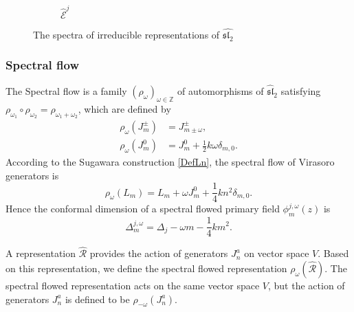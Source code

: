 \documentclass[10pt,a4paper]{article}
\numberwithin{equation}{section}
\begin{document}
\begin{figure}[htbp!]
\begin{subfigure}[b]{0.48\textwidth}
    \caption{$\widehat{\mathcal{E}}^{j}$}
    \label{fig:E}
\end{subfigure}

    \caption{The spectra of irreducible representations of $\widehat{\mathfrak{sl}_{2}}$}
    \label{fig:irrep}
\end{figure}

\subsubsection*{Spectral flow}
The Spectral flow is a family $(\rho_{\omega})_{\omega \in \mathbb{Z}}$ of automorphisms of $\widehat{\mathfrak{sl}}_{2}$
satisfying $\rho_{\omega_{1}} \circ \rho_{\omega_{2}}  = \rho_{\omega_{1} + \omega_{2}}$, which are defined by 
\begin{equation}
    \begin{aligned}
        \rho_{\omega}(J^{\pm}_{m}) & = J^{\pm}_{m \pm \omega},\\
        \rho_{\omega}(J^{0}_{m}) & = J^{0}_{m} + \frac{1}{2} k \omega \delta_{m,0}.
    \end{aligned}
\end{equation}
According to the Sugawara construction \eqref{DefLn}, the spectral flow of Virasoro generators is 
\begin{equation}
    \rho_{\omega}(L_{m}) = L_{m} + \omega J^{0}_{m} + \frac{1}{4} k n^{2} \delta_{m,0}.
\end{equation}
Hence the conformal dimension of a spectral flowed primary field $\phi^{j,\omega}_{m}(z)$ is 
\begin{equation}
    \Delta^{j,\omega}_{m} = \Delta_{j} - \omega m - \frac{1}{4} k m^{2}. \label{SpecFlowConDim}
\end{equation}

A representation $\widehat{\mathcal{R}} $ provides the action of generators $J^{a}_{n}$ on vector space $V$. Based on this representation, 
we define the spectral flowed representation $\rho_{\omega}\left(\hat{\mathcal{R}}\right)$. The spectral flowed representation acts on the 
same vector space $V$, but the action of generators $J^{a}_{n}$ is defined to be $\rho_{-\omega}\left(J^{a}_{n}\right)$. 
\end{document}
